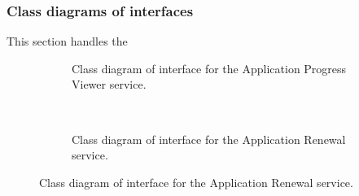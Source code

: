 \documentclass[12pt]{article}
\begin{document}
\subsubsection{Class diagrams of interfaces}
This section handles the 
\begin{figure}[H]

\begin{subfigure}[p]{0.47\textwidth}
\centering	
{}
\caption{Class diagram of interface for the Application Progress Viewer service.}
\end{subfigure}
~
\begin{subfigure}[p]{0.47\textwidth}
\centering	
{}
\caption{Class diagram of interface for the Application Renewal service.}
\end{subfigure}


\end{figure}
\end{document}
